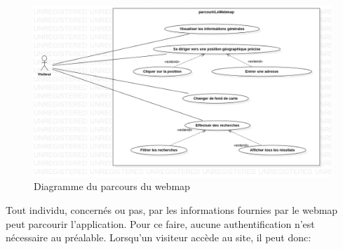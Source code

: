     \paragraph{}
    \begin{figure}
        \centering
        \includegraphics[width=1\textwidth]{images/Analyse_des_besoins/parcourirLeWeb.png}
        \caption{Diagramme du parcours du webmap}
    \end{figure}
\par 
Tout individu, concernés ou pas, par les informations fournies par 
le webmap peut parcourir l'application. Pour ce faire, aucune authentification 
n'est nécessaire au préalable. Lorsqu'un visiteur accède au site, il peut donc:
